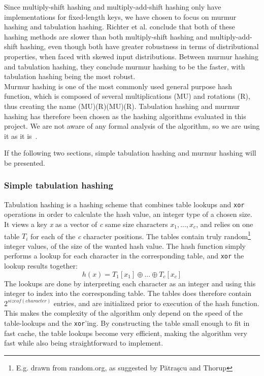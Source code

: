 \documentclass[11pt]{article} %
\begin{document}
Since multiply-shift hashing and multiply-add-shift hashing only have implementations for fixed-length keys, we have chosen to focus on murmur hashing and tabulation hashing. Richter et al. conclude that both of these hashing methods are slower than both multiply-shift hashing and multiply-add-shift hashing, even though both have greater robustness in terms of distributional properties, when faced with skewed input distributions. Between murmur hashing and tabulation hashing, they conclude murmur hashing to be the faster, with tabulation hashing being the most robust. \\

Murmur hashing is one of the most commonly used general purpose hash function, which is composed of several multiplications (MU) and rotations (R), thus creating the name (MU)(R)(MU)(R). Tabulation hashing and murmur hashing has therefore been chosen as the hashing algorithms evaluated in this project. We are not aware of any formal analysis of the algorithm, so we are using it as it is~\cite{Mur3}.

If the following two sections, simple tabulation hashing and murmur hashing will be presented.
\subsubsection{Simple tabulation hashing}
\label{subsubsec:background_simple_tabulation_hashing}
Tabulation hashing is a hashing scheme that combines table lookups and \verb|xor| operations in order to calculate the hash value, an integer type of a chosen size. It views a key \emph{x} as a vector of \emph{c} same size characters $x_1, ..., x_c$, and relies on one table $T_i$ for each of the \emph{c} character positions. The tables contain truly random\footnote{E.g. drawn from random.org, as suggested by Pătraşcu and Thorup} integer values, of the size of the wanted hash value. The hash function simply performs a lookup for each character in the corresponding table, and \verb|xor| the lookup results together:
$$h(x) = T_1[x_1] \oplus ... \oplus T_c[x_c]$$
The lookups are done by interpreting each character as an integer and using this integer to index into the corresponding table. The tables does therefore contain $2^{sizeof(character)}$ entries, and are initialized prior to execution of the hash function. This makes the complexity of the algorithm only depend on the speed of the table-lookups and the \verb|xor|'ing. By constructing the table small enough to fit in fast cache, the table lookups become very efficient, making the algorithm very fast while also being straightforward to implement.\\
\end{document}

